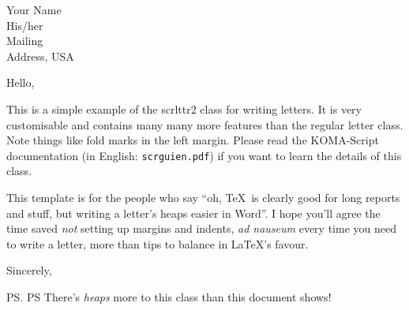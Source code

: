 \documentclass[fontsize=12pt, paper=a4]{scrlttr2}
\begin{document}
\begin{letter}{Your Name \\ His/her \\ Mailing \\ Address, USA} 

\opening{Hello,} 

This is a simple example of the \textsf{scrlttr2} class for writing letters. It is very customisable and contains many many more features than the regular \textsf{letter} class. Note things like fold marks in the left margin. Please read the KOMA-Script documentation (in English: \texttt{scrguien.pdf}) if you want to learn the details of this class.

This template is for the people who say ``oh, \TeX\ is clearly good for long reports and stuff, but writing a letter's heaps easier in Word''. I hope you'll agree the time saved \emph{not} setting up margins and indents, \textsl{ad nauseum} every time you need to write a letter, more than tips to balance in \LaTeX's favour.

\closing{Sincerely,}

\ps{PS There's \emph{heaps} more to this class than this document shows!}

\end{letter}
\end{document}
